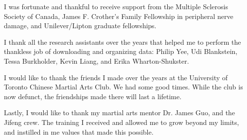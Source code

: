I was fortunate and thankful to receive support from the Multiple Sclerosis Society of Canada, James F. Crother's Family Fellowship in peripheral nerve damage, and Unilever/Lipton graduate fellowships. 

I thank all the research assistants over the years that helped me to perform the thankless job of downloading and organizing data: Philip Yee, Udi Blankstein, Tessa Burkholder, Kevin Liang, and Erika Wharton-Shukster. 

I would like to thank the friends I made over the years at the University of Toronto Chinese Martial Arts Club. We had some good times. While the club is now defunct, the friendships made there will last a lifetime. 

Lastly, I would like to thank my martial arts mentor Dr. James Guo, and the Jifeng crew. The training I received and allowed me to grow beyond my limits, and instilled in me values that made this possible.